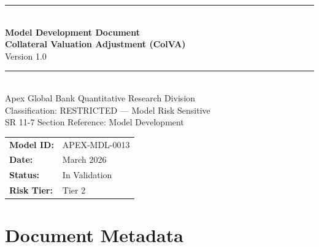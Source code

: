 \documentclass[11pt,a4paper]{article}
\begin{document}

\begin{titlepage}
  \begin{center}
    \vspace*{2cm}
    {\color{apexblue}\rule{\linewidth}{2pt}}\\[0.5cm]
    {\Huge\bfseries\color{apexblue} Model Development Document}\\[0.4cm]
    {\LARGE\bfseries Collateral Valuation Adjustment (ColVA)}\\[0.3cm]
    {\Large Version 1.0}\\[0.5cm]
    {\color{apexblue}\rule{\linewidth}{2pt}}\\[1cm]
    {\large Apex Global Bank \textbar{} Quantitative Research Division}\\[0.3cm]
    {\large\textcolor{apexred}{Classification: RESTRICTED --- Model Risk Sensitive}}\\[0.3cm]
    {\large SR 11-7 Section Reference: Model Development}\\[2cm]
    \begin{tabular}{ll}
      \textbf{Model ID:}   & APEX-MDL-0013 \\[4pt]
      \textbf{Date:}       & March 2026 \\[4pt]
      \textbf{Status:}     & In Validation \\[4pt]
      \textbf{Risk Tier:}  & Tier 2 \\
    \end{tabular}
  \end{center}
\end{titlepage}

\tableofcontents
\newpage

\section{Document Metadata}
\end{document}
